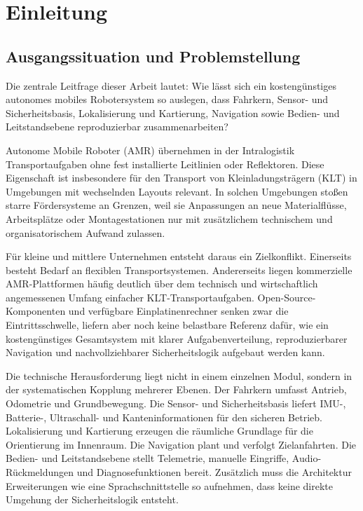 \chapter{Einleitung}

\section{Ausgangssituation und Problemstellung}

Die zentrale Leitfrage dieser Arbeit lautet: Wie lässt sich ein kostengünstiges autonomes mobiles Robotersystem so auslegen, dass Fahrkern, Sensor- und Sicherheitsbasis, Lokalisierung und Kartierung, Navigation sowie Bedien- und Leitstandsebene reproduzierbar zusammenarbeiten?

Autonome Mobile Roboter (AMR) übernehmen in der Intralogistik Transportaufgaben ohne fest installierte Leitlinien oder Reflektoren. Diese Eigenschaft ist insbesondere für den Transport von Kleinladungsträgern (KLT) in Umgebungen mit wechselnden Layouts relevant. In solchen Umgebungen stoßen starre Fördersysteme an Grenzen, weil sie Anpassungen an neue Materialflüsse, Arbeitsplätze oder Montagestationen nur mit zusätzlichem technischem und organisatorischem Aufwand zulassen.

Für kleine und mittlere Unternehmen entsteht daraus ein Zielkonflikt. Einerseits besteht Bedarf an flexiblen Transportsystemen. Andererseits liegen kommerzielle AMR-Plattformen häufig deutlich über dem technisch und wirtschaftlich angemessenen Umfang einfacher KLT-Transportaufgaben. Open-Source-Komponenten und verfügbare Einplatinenrechner senken zwar die Eintrittsschwelle, liefern aber noch keine belastbare Referenz dafür, wie ein kostengünstiges Gesamtsystem mit klarer Aufgabenverteilung, reproduzierbarer Navigation und nachvollziehbarer Sicherheitslogik aufgebaut werden kann.

Die technische Herausforderung liegt nicht in einem einzelnen Modul, sondern in der systematischen Kopplung mehrerer Ebenen. Der Fahrkern umfasst Antrieb, Odometrie und Grundbewegung. Die Sensor- und Sicherheitsbasis liefert IMU-, Batterie-, Ultraschall- und Kanteninformationen für den sicheren Betrieb. Lokalisierung und Kartierung erzeugen die räumliche Grundlage für die Orientierung im Innenraum. Die Navigation plant und verfolgt Zielanfahrten. Die Bedien- und Leitstandsebene stellt Telemetrie, manuelle Eingriffe, Audio-Rückmeldungen und Diagnosefunktionen bereit. Zusätzlich muss die Architektur Erweiterungen wie eine Sprachschnittstelle so aufnehmen, dass keine direkte Umgehung der Sicherheitslogik entsteht.

